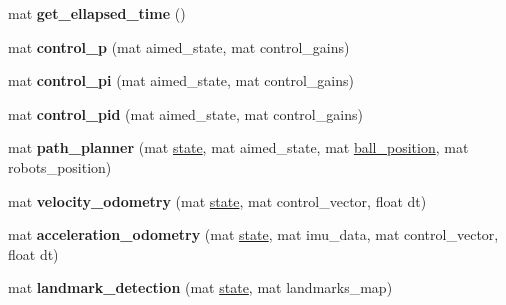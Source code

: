 \begin{DoxyCompactItemize}
mat {\bfseries get\+\_\+ellapsed\+\_\+time} ()
\item 
\mbox{\label{class_robot_navigation_a81ea2b1ff7b0701a716ab6b8bac92be4}} 
mat {\bfseries control\+\_\+p} (mat aimed\+\_\+state, mat control\+\_\+gains)
\item 
\mbox{\label{class_robot_navigation_aa00a37c4a425f8ba2b83a208845747f5}} 
mat {\bfseries control\+\_\+pi} (mat aimed\+\_\+state, mat control\+\_\+gains)
\item 
\mbox{\label{class_robot_navigation_a5800adf6538584180ca33a2143934dfd}} 
mat {\bfseries control\+\_\+pid} (mat aimed\+\_\+state, mat control\+\_\+gains)
\item 
\mbox{\label{class_robot_navigation_a676195ab5a04e08452dc6fb23f84ce10}} 
mat {\bfseries path\+\_\+planner} (mat \hyperlink{class_robot_navigation_a93eb7dd2877e1f72f5741fb396adea81}{state}, mat aimed\+\_\+state, mat \hyperlink{class_robot_navigation_a1e4f1a5b3c01ba9be911c006b478f371}{ball\+\_\+position}, mat robots\+\_\+position)
\item 
\mbox{\label{class_robot_navigation_a50667808e539f4b632af5f60628cc228}} 
mat {\bfseries velocity\+\_\+odometry} (mat \hyperlink{class_robot_navigation_a93eb7dd2877e1f72f5741fb396adea81}{state}, mat control\+\_\+vector, float dt)
\item 
\mbox{\label{class_robot_navigation_a0ca549632dc878d276ab2da06e5ed41b}} 
mat {\bfseries acceleration\+\_\+odometry} (mat \hyperlink{class_robot_navigation_a93eb7dd2877e1f72f5741fb396adea81}{state}, mat imu\+\_\+data, mat control\+\_\+vector, float dt)
\item 
\mbox{\label{class_robot_navigation_a94927041a7f2f2bc9c45803a84d5a9d6}} 
mat {\bfseries landmark\+\_\+detection} (mat \hyperlink{class_robot_navigation_a93eb7dd2877e1f72f5741fb396adea81}{state}, mat landmarks\+\_\+map)
\end{DoxyCompactItemize}
